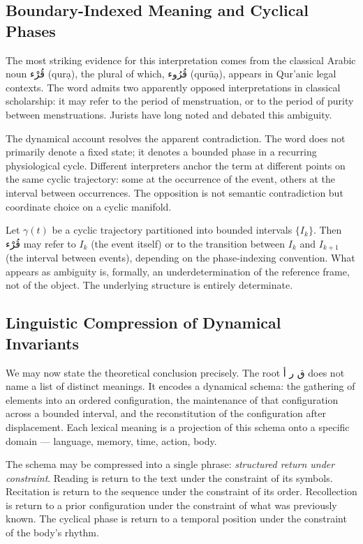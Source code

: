 \documentclass[12pt, oneside]{article}
\newcommand{\AR}[1]{\textarabic{#1}}
\theoremstyle{definition}
\theoremstyle{remark}
\begin{document}
\subsection{Boundary-Indexed Meaning and Cyclical Phases}

The most striking evidence for this interpretation comes from the classical Arabic noun \AR{قُرْء} (qur\d{a}), the plural of which, \AR{قُرُوء} (qur\=u\d{a}), appears in Qur'anic legal contexts.
The word admits two apparently opposed interpretations in classical scholarship: it may refer to the period of menstruation, or to the period of purity between menstruations.
Jurists have long noted and debated this ambiguity.

The dynamical account resolves the apparent contradiction.
The word does not primarily denote a fixed state; it denotes a bounded phase in a recurring physiological cycle.
Different interpreters anchor the term at different points on the same cyclic trajectory: some at the occurrence of the event, others at the interval between occurrences.
The opposition is not semantic contradiction but coordinate choice on a cyclic manifold.

Let $\gamma(t)$ be a cyclic trajectory partitioned into bounded intervals $\{I_{k}\}$.
Then \AR{قُرْء} may refer to $I_{k}$ (the event itself) or to the transition between $I_{k}$ and $I_{k+1}$ (the interval between events), depending on the phase-indexing convention.
What appears as ambiguity is, formally, an underdetermination of the reference frame, not of the object.
The underlying structure is entirely determinate.

\subsection{Linguistic Compression of Dynamical Invariants}

We may now state the theoretical conclusion precisely.
The root \AR{ق ر أ} does not name a list of distinct meanings.
It encodes a dynamical schema: the gathering of elements into an ordered configuration, the maintenance of that configuration across a bounded interval, and the reconstitution of the configuration after displacement.
Each lexical meaning is a projection of this schema onto a specific domain --- language, memory, time, action, body.

The schema may be compressed into a single phrase: \emph{structured return under constraint}.
Reading is return to the text under the constraint of its symbols.
Recitation is return to the sequence under the constraint of its order.
Recollection is return to a prior configuration under the constraint of what was previously known.
The cyclical phase is return to a temporal position under the constraint of the body's rhythm.
\end{document}
